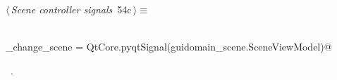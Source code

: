 \documentclass[
    a4paper,      %
    10pt,         %
    openright,    %
    notitlepage,  %
    parskip=half, %
]{scrreprt}       %
\theoremstyle{definition}                    %
\begin{document}
\begin{flushleft} \small
\begin{minipage}{\linewidth}\label{scrap86}\raggedright\small
{} $\langle\,${\itshape Scene controller signals}\nobreak\ {\footnotesize {54c}}$\,\rangle\equiv$
\vspace{-1ex}
\begin{list}{}{} \item
\mbox{}\lstinline@@\\
\mbox{}\lstinline@do_change_scene = QtCore.pyqtSignal(guidomain_scene.SceneViewModel)@\\
\mbox{}\lstinline@@{\NWsep}
\end{list}
\vspace{-1.5ex}
\footnotesize
\begin{list}{}{\setlength{\itemsep}{-\parsep}\setlength{\itemindent}{-\leftmargin}}
\item \NWtxtMacroRefIn\ .

\item{}
\end{list}
\end{minipage}\vspace{4ex}
\end{flushleft}
\end{document}
